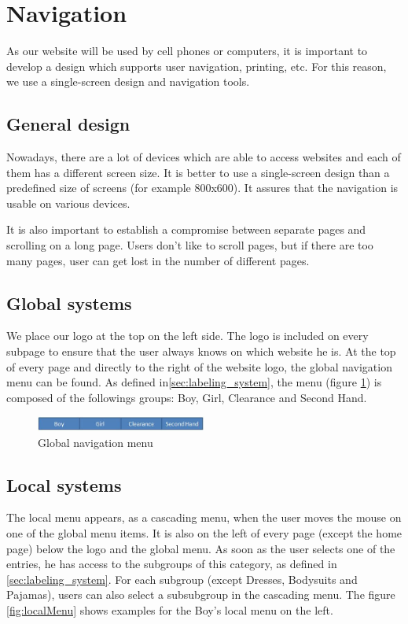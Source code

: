 \section{Navigation}

As our website will be used by cell phones or computers, it is important to develop a design which supports user navigation, printing, etc. For this reason, we use a single-screen design and navigation tools.

\subsection{General design}

Nowadays, there are a lot of devices which are able to access websites and each of them has a different screen size. It is better to use a single-screen design than a predefined size of screens (for example 800x600). It assures that the navigation is usable on various devices. 

It is also important to establish a compromise between separate pages and scrolling on a long page. Users don't like to scroll pages, but if there are too many pages, user can get lost in the number of different pages.

\subsection{Global systems}

We place our logo at the top on the left side. The logo is included on every subpage to ensure that the user always knows on which website he is.
At the top of every page and directly to the right of the website logo, the global navigation menu can be found. As defined in\ref{sec:labeling_system}, the menu (figure \ref{fig:globalMenu}) is composed of the followings groups: Boy, Girl, Clearance and Second Hand.

\begin{figure}[h!]
  \centering  
  \includegraphics[width=0.5\textwidth]{Images/globalMenu.jpg}                
  \caption{Global navigation menu}
  \label{fig:globalMenu}
\end{figure}


\subsection{Local systems}\label{sec:local_systems}
The local menu appears, as a cascading menu, when the user moves the mouse on one of the global menu items. It is also on the left of every page (except the home page) below the logo and the global menu. As soon as the user selects one of the entries, he has access to the subgroups of this category, as defined in \ref{sec:labeling_system}. For each subgroup (except Dresses, Bodysuits and Pajamas), users can also select a subsubgroup in the cascading menu. The figure \ref{fig:localMenu} shows examples for the Boy's local menu on the left.

